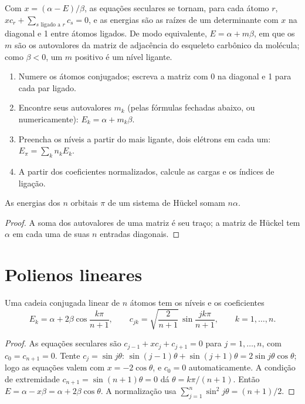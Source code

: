 Com $x = (\alpha - E)/\beta$, as equações seculares se tornam, para cada átomo $r$,
$xc_r + \sum_{s \text{ ligado a } r} c_s = 0$, e as energias são as raízes de um
determinante com $x$ na diagonal e 1 entre átomos ligados. De modo equivalente,
$E =
\alpha + m\beta$, em que os $m$ são os autovalores da matriz de adjacência do
esqueleto carbônico da molécula; como $\beta < 0$, um $m$ positivo é um nível
ligante.

\begin{method}\label{met:b2:huckel:huckel}
\begin{enumerate}
  \item Numere os átomos conjugados; escreva a matriz com 0 na diagonal e 1
        para cada par ligado.
  \item Encontre seus autovalores $m_k$ (pelas fórmulas fechadas abaixo, ou
        numericamente): $E_k =
        \alpha + m_k\beta$.
  \item Preencha os níveis a partir do mais ligante, dois elétrons em cada um:
        $E_\pi = \sum_k n_k E_k$.
  \item A partir dos coeficientes normalizados, calcule as cargas e os índices
        de ligação.
\end{enumerate}
\end{method}

\begin{proposition}[Traço]\label{prop:b2:huckel:trace}
As energias dos $n$ orbitais $\pi$ de um sistema de Hückel somam $n\alpha$.
\end{proposition}

\begin{proof}
A soma dos autovalores de uma matriz é seu traço; a matriz de Hückel tem $\alpha$
em cada uma de suas $n$ entradas diagonais.
\end{proof}

\section{Polienos lineares}

\begin{theorem}\label{thm:b2:huckel:polyene}
Uma cadeia conjugada linear de $n$ átomos tem os níveis e os coeficientes
\[
  E_k = \alpha + 2\beta\cos\frac{k\pi}{n + 1}, \qquad
  c_{jk} = \sqrt{\frac{2}{n + 1}}\,\sin\frac{jk\pi}{n + 1}, \qquad k = 1, \dots, n .
\]
\end{theorem}

\begin{proof}
As equações seculares são $c_{j-1} + xc_j + c_{j+1} = 0$ para $j = 1, \dots, n$, com
$c_0 = c_{n+1} = 0$. Tente $c_j = \sin j\theta$: $\sin(j - 1)\theta + \sin(j + 1)\theta = 2\sin
j\theta\cos\theta$; logo as equações valem com $x = -2\cos\theta$, e $c_0 = 0$
automaticamente. A condição de extremidade $c_{n+1} = \sin(n + 1)\theta = 0$ dá $\theta =
k\pi/(n + 1)$. Então $E = \alpha - x\beta = \alpha + 2\beta\cos\theta$. A normalização usa
$\sum_{j=1}^n\sin^2 j\theta = (n + 1)/2$.
\end{proof}

